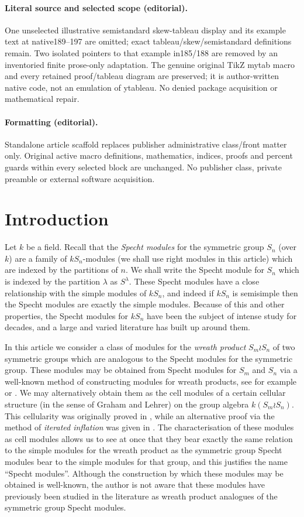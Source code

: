 \documentclass[10pt]{article}
\theoremstyle{definition}
\begin{document}
\paragraph{Literal source and selected scope (editorial).} One unselected illustrative semistandard skew-tableau display and its example text at native189--197 are omitted; exact tableau/skew/semistandard definitions remain. Two isolated pointers to that example in185/188 are removed by an inventoried finite prose-only adaptation. The genuine original TikZ mytab macro and every retained proof/tableau diagram are preserved; it is author-written native code, not an emulation of ytableau. No denied package acquisition or mathematical repair.
\paragraph{Formatting (editorial).} Standalone article scaffold replaces publisher administrative class/front matter only. Original active macro definitions, mathematics, indices, proofs and percent guards within every selected block are unchanged. No publisher class, private preamble or external software acquisition.
\clearpage
\section{Introduction}
Let $k$ be a field. Recall that the \textit{Specht modules} for the symmetric group $S_n$ (over $k$) are a family of $kS_n$-modules
(we shall use right modules in this article) which are indexed by the partitions of $n$. We shall write the Specht module for $S_n$ which
is indexed by the partition $\lambda$ as $S^\lambda$. These Specht modules have a close relationship with the simple modules of
$kS_n$, and indeed if $kS_n$ is semisimple then the Specht modules are exactly the simple modules. Because of this and other properties,
the Specht modules for $kS_n$ have been the subject of intense study for decades, and a large and varied literature has built up around
them.

In this article we consider a class of modules for the \textit{wreath product} $S_m \wr S_n$ of two symmetric groups which are
analogous to the Specht modules for the symmetric group. These modules may be obtained from Specht modules for $S_m$ and $S_n$ via
a well-known method of constructing modules for wreath products, see for example \cite{CHTAN} or \cite[chapter 4]{JAMKER}.
We may alternatively obtain them as the cell modules of a certain cellular structure (in the sense of Graham and Lehrer) on the group
algebra $k(S_m \wr S_n)$. This cellularity was originally proved in \cite{GEGO}, while an alternative proof via the method of
\textit{iterated inflation} was given in \cite{GCSWPA}. The characterisation of these modules as cell modules
allows us to see at once that they bear exactly the same relation to the simple modules for the wreath product as the symmetric group
Specht modules bear to the simple modules for that group, and this justifies the name ``Specht modules''. Although the construction by
which these modules may be obtained is well-known, the author is not aware that these modules have previously been studied in the
literature as wreath product analogues of the symmetric group Specht modules.
\end{document}
